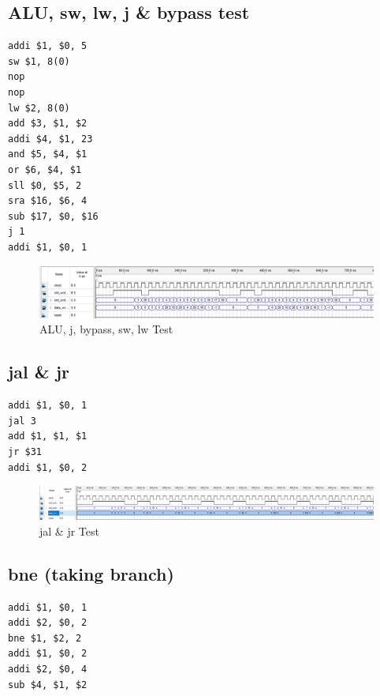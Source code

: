 \documentclass[letterpaper]{article} %
\begin{document}
\subsection{ALU, sw, lw, j \& bypass test}
\begin{verbatim} 
addi $1, $0, 5
sw $1, 8(0)
nop
nop
lw $2, 8(0)
add $3, $1, $2 
addi $4, $1, 23
and $5, $4, $1
or $6, $4, $1
sll $0, $5, 2
sra $16, $6, 4 
sub $17, $0, $16
j 1
addi $1, $0, 1

\end{verbatim}

   \FloatBarrier

  \begin{figure}[!htb]
        \includegraphics[scale=.5]{ALUtest.PNG}
        \caption{ALU, j, bypass, sw, lw Test}
        \label{fig:2}
    \end{figure}
    
       \FloatBarrier
       
\pagebreak

\subsection{jal & jr}
\begin{verbatim}
addi $1, $0, 1
jal 3
add $1, $1, $1
jr $31
addi $1, $0, 2

\end{verbatim}

   \FloatBarrier

  \begin{figure}[!htb]
        \includegraphics[scale=.4]{jaljrTest.PNG}
        \caption{jal \& jr Test}
        \label{fig:2}
    \end{figure}
    
       \FloatBarrier

    
\subsection{bne (taking branch)}
\begin{verbatim}
addi $1, $0, 1
addi $2, $0, 2
bne $1, $2, 2
addi $1, $0, 2
addi $2, $0, 4
sub $4, $1, $2  

\end{verbatim}
\end{document}
